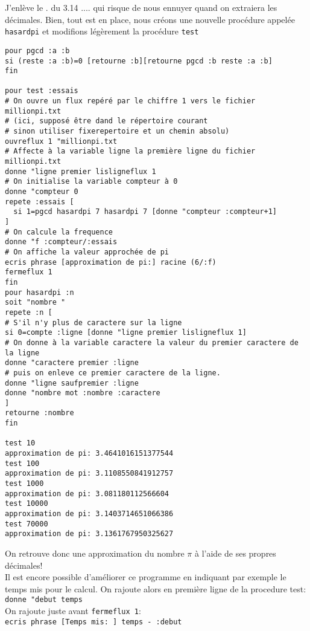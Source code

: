 J'enlève le \og . \fg du 3.14 .... qui risque de nous ennuyer quand on extraiera les décimales. Bien, tout est en place, nous créons une nouvelle procédure appelée \texttt{hasardpi} et modifions légèrement la procédure \texttt{test}
\begin{verbatim}
pour pgcd :a :b
si (reste :a :b)=0 [retourne :b][retourne pgcd :b reste :a :b] 
fin

pour test :essais
# On ouvre un flux repéré par le chiffre 1 vers le fichier millionpi.txt
# (ici, supposé être dand le répertoire courant 
# sinon utiliser fixerepertoire et un chemin absolu)
ouvreflux 1 "millionpi.txt
# Affecte à la variable ligne la première ligne du fichier millionpi.txt
donne "ligne premier lisligneflux 1
# On initialise la variable compteur à 0
donne "compteur 0
repete :essais [
  si 1=pgcd hasardpi 7 hasardpi 7 [donne "compteur :compteur+1]
]
# On calcule la frequence
donne "f :compteur/:essais
# On affiche la valeur approchée de pi
ecris phrase [approximation de pi:] racine (6/:f)
fermeflux 1
fin
pour hasardpi :n
soit "nombre "
repete :n [
# S'il n'y plus de caractere sur la ligne
si 0=compte :ligne [donne "ligne premier lisligneflux 1]
# On donne à la variable caractere la valeur du premier caractere de la ligne
donne "caractere premier :ligne
# puis on enleve ce premier caractere de la ligne.
donne "ligne saufpremier :ligne
donne "nombre mot :nombre :caractere
]
retourne :nombre
fin

test 10
approximation de pi: 3.4641016151377544 
test 100
approximation de pi: 3.1108550841912757 
test 1000
approximation de pi: 3.081180112566604 
test 10000
approximation de pi: 3.1403714651066386 
test 70000
approximation de pi: 3.1361767950325627
\end{verbatim}
On retrouve donc une approximation du nombre $\pi$ à l'aide de ses propres décimales!\\ 
Il est encore possible d'améliorer ce programme en indiquant par exemple le temps mis pour le calcul. On rajoute alors en première ligne de la procedure test:\\
\texttt{donne "debut temps}\\
On rajoute juste avant \texttt{fermeflux 1}:\\
\texttt{ecris phrase [Temps mis: ] temps - :debut}\\
